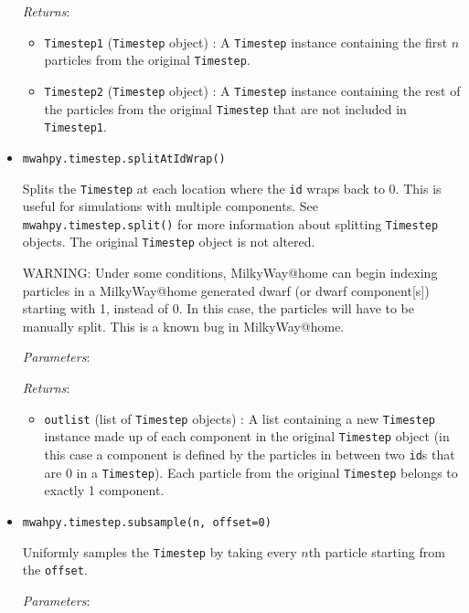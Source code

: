 \documentclass{article}
\begin{document}
\begin{itemize}
\textit{Returns}:  \begin{itemize}

\item \verb!Timestep1! (\verb!Timestep! object) : A \verb!Timestep! instance containing the first $n$ particles from the original \verb!Timestep!.

\item \verb!Timestep2! (\verb!Timestep! object) : A \verb!Timestep! instance containing the rest of the particles from the original \verb!Timestep! that are not included in \verb!Timestep1!.

\end{itemize}



\item \verb!mwahpy.timestep.splitAtIdWrap()!

Splits the \verb!Timestep! at each location where the \verb!id! wraps back to 0. This is useful for simulations with multiple components. See \verb!mwahpy.timestep.split()! for more information about splitting \verb!Timestep! objects. The original \verb!Timestep! object is not altered.

WARNING: Under some conditions, MilkyWay@home can begin indexing particles in a MilkyWay@home generated dwarf (or dwarf component[s]) starting with 1, instead of 0. In this case, the particles will have to be manually split. This is a known bug in MilkyWay@home.

\textit{Parameters}:

\textit{Returns}:  \begin{itemize}

\item \verb!outlist! (list of \verb!Timestep! objects) : A list containing a new \verb!Timestep! instance made up of each component in the original \verb!Timestep! object (in this case a component is defined by the particles in between two \verb!id!s that are 0 in a \verb!Timestep!). Each particle from the original \verb!Timestep! belongs to exactly 1 component.

\end{itemize}



\item \verb!mwahpy.timestep.subsample(n, offset=0)!

Uniformly samples the \verb!Timestep! by taking every $n$th particle starting from the \verb!offset!.

\textit{Parameters}: \begin{itemize}


\end{itemize}
\end{itemize}
\end{document}
